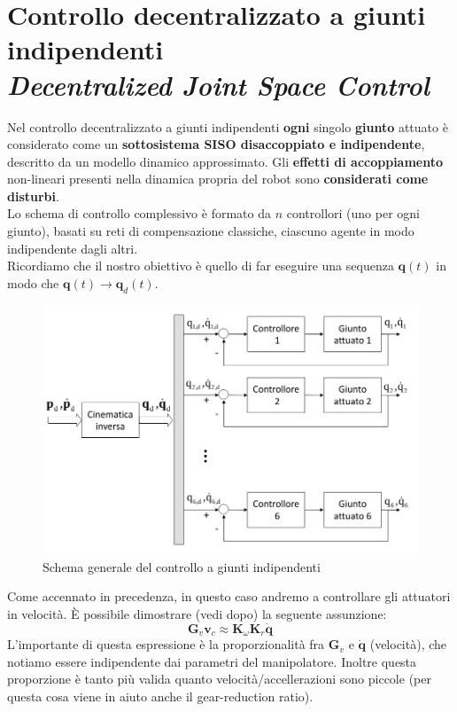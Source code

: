 \section{Controllo decentralizzato a giunti indipendenti \\ {\small \textit{Decentralized Joint Space Control}}}

Nel controllo decentralizzato a giunti indipendenti \textbf{ogni} singolo \textbf{giunto} attuato è considerato come un \textbf{sottosistema SISO disaccoppiato e indipendente}, descritto da un modello dinamico approssimato. Gli \textbf{effetti di accoppiamento} non-lineari presenti nella dinamica propria del robot sono \textbf{considerati come disturbi}.\\

Lo schema di controllo complessivo è formato da $n$ controllori (uno per ogni giunto), basati su reti di compensazione classiche, ciascuno agente in modo indipendente dagli altri.\\
Ricordiamo che il nostro obiettivo è quello di far eseguire una sequenza $\mathbf{q}(t)$ in modo che $\mathbf{q}(t) \to \mathbf{q}_d(t)$.\\	


\begin{figure}[th!]
	\centering
	\includegraphics[width=0.7\linewidth]{images/decentralized_joint_space_control_1}
	\caption{Schema generale del controllo a giunti indipendenti}
	\label{fig:decentralizedjointspacecontrol1}
\end{figure}


Come accennato in precedenza, in questo caso andremo a controllare gli attuatori in velocità. È possibile dimostrare (vedi dopo) la seguente assunzione:
$$
\mathbf{G}_v\mathbf{v}_c \approx \mathbf{K}_\omega\mathbf{K}_r\mathbf{\dot{q}}
$$
L'importante di questa espressione è la proporzionalità fra $\mathbf{G}_v$ e  $\dot{\mathbf{q}}$ (velocità), che notiamo essere indipendente dai parametri del manipolatore. Inoltre questa proporzione è tanto più valida quanto velocità/accellerazioni sono piccole (per questa cosa viene in aiuto anche il gear-reduction ratio).


